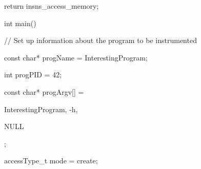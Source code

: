 {{{{{{{{

}}





\bigskip



{

return insns_access_memory;}



{

}}





\bigskip





\bigskip





\bigskip





\bigskip





\bigskip





\bigskip



{

int main() {}



{

// Set up information about the program to be instrumented}



{

const char* progName = {\textquotedbl}InterestingProgram{\textquotedbl};}



{

int progPID = 42;}



{

const char* progArgv[] = {{\textquotedbl}InterestingProgram{\textquotedbl}, {\textquotedbl}-h{\textquotedbl},

NULL};}



{

accessType_t mode = create;}





\bigskip



{

}}}}}}}
